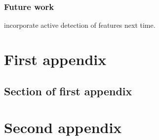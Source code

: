 \documentclass{mproj}
\begin{document}
\subsection{Future work}

incorporate active detection of features next time.

\appendix %
\chapter{First appendix}

\section{Section of first appendix}

\chapter{Second appendix}



\end{document}
